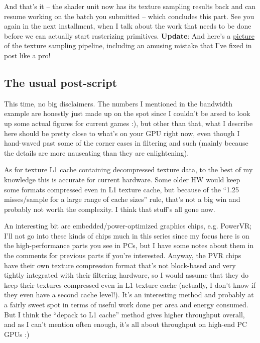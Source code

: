\documentclass[12pt]{article}
\begin{document}
And that’s it – the shader unit now has its texture sampling results back and can resume working on the batch you submitted – which concludes this part. See you again in the next installment, when I talk about the work that needs to be done before we can actually start rasterizing primitives.
\textbf{\textbf{Update}}: And here’s a \href{http://www.farbrausch.de/\~fg/gpu/texture\_sample.jpg}{picture} of the texture sampling pipeline, including an amusing mistake that I’ve fixed in post like a pro!

\subsection{The usual post-script}
\label{sec:orgf72d281}

This time, no big disclaimers. The numbers I mentioned in the bandwidth example are honestly just made up on the spot since I couldn’t be arsed to look up some actual figures for current games :), but other than that, what I describe here should be pretty close to what’s on your GPU right now, even though I hand-waved past some of the corner cases in filtering and such (mainly because the details are more nauseating than they are enlightening).

As for texture L1 cache containing decompressed texture data, to the best of my knowledge this is accurate for current hardware. Some older HW would keep some formats compressed even in L1 texture cache, but because of the “1.25 misses/sample for a large range of cache sizes” rule, that’s not a big win and probably not worth the complexity. I think that stuff’s all gone now.

An interesting bit are embedded/power-optimized graphics chips, e.g. PowerVR; I’ll not go into these kinds of chips much in this series since my focus here is on the high-performance parts you see in PCs, but I have some notes about them in the comments for previous parts if you’re interested. Anyway, the PVR chips have their own texture compression format that’s not block-based and very tightly integrated with their filtering hardware, so I would assume that they do keep their textures compressed even in L1 texture cache (actually, I don’t know if they even have a second cache level!). It’s an interesting method and probably at a fairly sweet spot in terms of useful work done per area and energy consumed. But I think the “depack to L1 cache” method gives higher throughput overall, and as I can’t mention often enough, it’s all about throughput on high-end PC GPUs :)
\end{document}
